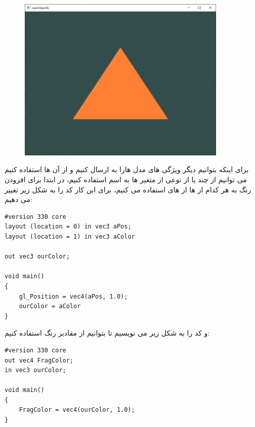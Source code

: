 \documentclass[a4paper, 12pt]{book}
\newcommand{\lrit}[1]{\lr{\textit{#1}}}
\begin{document}
\vspace*{0.3cm}
\begin{figure}[ht]
    \centering
    \href{https://learnopengl.com}{
        \includegraphics[width=10cm]{images/hellotriangle.png}
    }
    \caption{}
    \label{fig:my_label}
\end{figure}
\vspace*{0.3cm}

\newpage
    برای اینکه بتوانیم دیگر ویژگی های مدل هارا به  ارسال کنیم و از آن ها استفاده کنیم می توانیم از چند  یا از نوعی از متغیر ها به اسم  استفاده کنیم، در ابتدا برای افزودن رنگ به هر کدام از  ها از  های  استفاده می کنیم، برای این کار کد   را به شکل زیر تغییر می دهیم:

    \begin{LTR}
    \small
        \begin{lstlisting}[style=C++Style,caption=\lrit{declare and use aColor}]
#version 330 core
layout (location = 0) in vec3 aPos;
layout (location = 1) in vec3 aColor

out vec3 ourColor;

void main()
{
    gl_Position = vec4(aPos, 1.0);
    ourColor = aColor
}
        \end{lstlisting}
    \end{LTR}
    \normalsize
    \vspace*{0.3cm}

    و کد  را به شکل زیر می نویسیم تا بتوانیم از مقادیر رنگ استفاده کنیم:
    \begin{LTR}
    \small
        \begin{lstlisting}[style=C++Style,caption=\lrit{render fragment with color from vertex shader}]
#version 330 core
out vec4 FragColor;
in vec3 ourColor;

void main()
{
    FragColor = vec4(ourColor, 1.0);
}
        \end{lstlisting}
    \end{LTR}
    \normalsize
    \vspace*{0.3cm}
\end{document}
